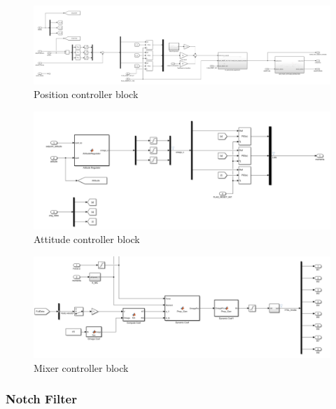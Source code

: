 \begin{figure}
  \centering
      \includegraphics[width=1\linewidth]{Images/position_controller.png}
      \caption{Position controller block}
      \label{fig:position_controller}
\end{figure}

\begin{figure}
  \centering
      \includegraphics[width=1\linewidth]{Images/attitude_controller.png}
      \caption{Attitude controller block}
      \label{fig:attitude_controller}
\end{figure}

\begin{figure}
  \centering
      \includegraphics[width=1\linewidth]{Images/mixer_control.png}
      \caption{Mixer controller block}
      \label{fig:mixer_control}
\end{figure}

\subsubsection{Notch Filter}

